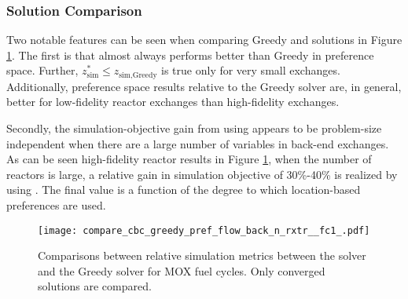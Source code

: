 \subsubsection{Solution Comparison}\label{sec:res:scale:front:soln}

Two notable features can be seen when comparing Greedy and \cbc solutions in
Figure \ref{fig:compare_cbc_greedy_pref_flow_back_n_rxtr__fc1_}. The first is
that \cbc almost always performs better than Greedy in preference space. Further,
$z^*_{\text{sim}} \leq z_{\text{sim}, \text{Greedy}}$ is true only for very
small exchanges. Additionally, \cbc preference space results relative to the
Greedy solver are, in general, better for low-fidelity reactor exchanges than
high-fidelity exchanges.

Secondly, the simulation-objective gain from using \cbc appears to be
problem-size independent when there are a large number of variables in back-end
exchanges. As can be seen high-fidelity reactor results in Figure
\ref{fig:compare_cbc_greedy_pref_flow_back_n_rxtr__fc1_}, when the number of
reactors is large, a relative gain in simulation objective of 30\%-40\% is
realized by using \cbc. The final value is a function of the degree to which
location-based preferences are used.

\begin{figure}[h!]
  \begin{center}
    \texttt{[image: compare\_cbc\_greedy\_pref\_flow\_back\_n\_rxtr\_\_fc1\_.pdf]}
    \caption{
      \label{fig:compare_cbc_greedy_pref_flow_back_n_rxtr__fc1_}
      Comparisons between relative simulation metrics between the \cbc solver and
      the Greedy solver for MOX fuel cycles. Only converged \cbc
      solutions are compared.  }
  \end{center}
\end{figure}
